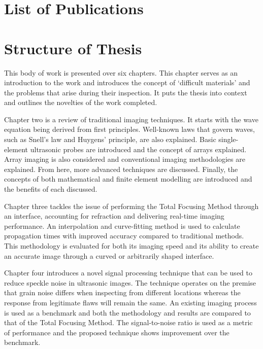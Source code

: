 \section{List of Publications}
\begin{itemize}

\end{itemize}
\section{Structure of Thesis}

This body of work is presented over six chapters. This chapter serves as an introduction to the work and introduces the concept of `difficult materials' and the problems that arise during their inspection. It puts the thesis into context and outlines the novelties of the work completed. 

Chapter two is a review of traditional imaging techniques. It starts with the wave equation being derived from first principles. Well-known laws that govern waves, such as Snell's law and Huygens' principle, are also explained. Basic single-element ultrasonic probes are introduced and the concept of arrays explained. Array imaging is also considered and conventional imaging methodologies are explained. From here, more advanced techniques are discussed.	Finally, the concepts of both mathematical and finite element modelling are introduced and the benefits of each discussed.

Chapter three tackles the issue of performing the Total Focusing Method through an interface, accounting for refraction and delivering real-time imaging performance. An interpolation and curve-fitting method is used to calculate propagation times with improved accuracy compared to traditional methods. This methodology is evaluated for both its imaging speed and its ability to create an accurate image through a curved or arbitrarily shaped interface. 

Chapter four introduces a novel signal processing technique that can be used to reduce speckle noise in ultrasonic images. The technique operates on the premise that grain noise differs when inspecting from different locations whereas the response from legitimate flaws will remain the same. An existing imaging process is used as a benchmark and both the methodology and results are compared to that of the Total Focusing Method. The signal-to-noise ratio is used as a metric of performance and the proposed technique shows improvement over the benchmark.

